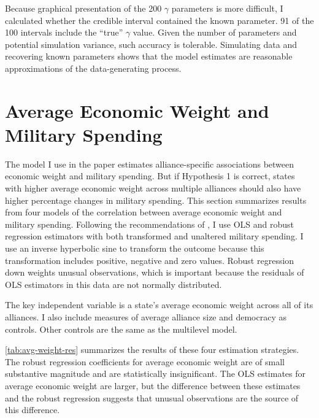 \documentclass[12pt]{article}
\begin{document}
Because graphical presentation of the 200 $\gamma$ parameters is more difficult, I calculated whether the credible interval contained the known parameter. 
91 of the 100 intervals include the ``true'' $\gamma$ value. 
Given the number of parameters and potential simulation variance, such accuracy is tolerable. 
Simulating data and recovering known parameters shows that the model estimates are reasonable approximations of the data-generating process. 


\section{Average Economic Weight and Military Spending}


The model I use in the paper estimates alliance-specific associations between economic weight and military spending. 
But if Hypothesis 1 is correct, states with higher average economic weight across multiple alliances should also have higher percentage changes in military spending. 
This section summarizes results from four models of the correlation between average economic weight and military spending. 
Following the recommendations of \citep{RaineyBaissa2018}, I use OLS and robust regression estimators with both transformed and unaltered military spending.  
I use an inverse hyperbolic sine to transform the outcome because this transformation includes positive, negative and zero values. 
Robust regression down weights unusual observations, which is important because the residuals of OLS estimators in this data are not normally distributed. 


The key independent variable is a state's average economic weight across all of its alliances. 
I also include measures of average alliance size and democracy \citep{DigiuseppePoast2016} as controls. 
Other controls are the same as the multilevel model.  


\autoref{tab:avg-weight-res} summarizes the results of these four estimation strategies. 
The robust regression coefficients for average economic weight are of small substantive magnitude and are statistically insignificant. 
The OLS estimates for average economic weight are larger, but the difference between these estimates and the robust regression suggests that unusual observations are the source of this difference. 
\end{document}
